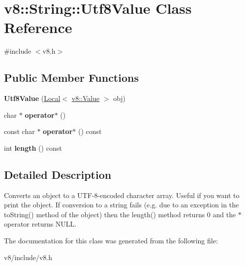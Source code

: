 \hypertarget{classv8_1_1String_1_1Utf8Value}{}\section{v8\+:\+:String\+:\+:Utf8\+Value Class Reference}
\label{classv8_1_1String_1_1Utf8Value}


{\ttfamily \#include $<$v8.\+h$>$}

\subsection*{Public Member Functions}
\begin{DoxyCompactItemize}
\item 
{\bfseries Utf8\+Value} (\hyperlink{classv8_1_1Local}{Local}$<$ \hyperlink{classv8_1_1Value}{v8\+::\+Value} $>$ obj)\hypertarget{classv8_1_1String_1_1Utf8Value_ab1a11cc4d69082dfb2b9dd2dc319cfa8}{}\label{classv8_1_1String_1_1Utf8Value_ab1a11cc4d69082dfb2b9dd2dc319cfa8}

\item 
char $\ast$ {\bfseries operator$\ast$} ()\hypertarget{classv8_1_1String_1_1Utf8Value_a6cb4914bc426bbe60b0dfdff32213e59}{}\label{classv8_1_1String_1_1Utf8Value_a6cb4914bc426bbe60b0dfdff32213e59}

\item 
const char $\ast$ {\bfseries operator$\ast$} () const \hypertarget{classv8_1_1String_1_1Utf8Value_a6557ad0916c472faebd8bfdc3da5c4f7}{}\label{classv8_1_1String_1_1Utf8Value_a6557ad0916c472faebd8bfdc3da5c4f7}

\item 
int {\bfseries length} () const \hypertarget{classv8_1_1String_1_1Utf8Value_a1e2572abf6adc0786769482df9906f19}{}\label{classv8_1_1String_1_1Utf8Value_a1e2572abf6adc0786769482df9906f19}

\end{DoxyCompactItemize}


\subsection{Detailed Description}
Converts an object to a U\+T\+F-\/8-\/encoded character array. Useful if you want to print the object. If conversion to a string fails (e.\+g. due to an exception in the to\+String() method of the object) then the length() method returns 0 and the $\ast$ operator returns N\+U\+LL. 

The documentation for this class was generated from the following file\+:\begin{DoxyCompactItemize}
\item 
v8/include/v8.\+h\end{DoxyCompactItemize}
